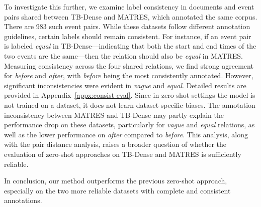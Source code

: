 To investigate this further, we examine label consistency in documents and event pairs shared between TB-Dense and MATRES, which annotated the same corpus. There are 983 such event pairs. While these datasets follow different annotation guidelines, certain labels should remain consistent. For instance, if an event pair is labeled \textit{equal} in TB-Dense—indicating that both the start and end times of the two events are the same—then the relation should also be \textit{equal} in MATRES. Measuring consistency across the four shared relations, we find strong agreement for \textit{before} and \textit{after}, with \textit{before} being the most consistently annotated. However, significant inconsistencies were evident in \textit{vague} and \textit{equal}. Detailed results are provided in Appendix~\ref{appx:consist-eval}.  
Since in zero-shot settings the model is not trained on a dataset, it does not learn dataset-specific biases. The annotation inconsistency between MATRES and TB-Dense may partly explain the performance drop on these datasets, particularly for \textit{vague} and \textit{equal} relations, as well as the lower performance on \textit{after} compared to \textit{before}.
This analysis, along with the pair distance analysis, raises a broader question of whether the evaluation of zero-shot approaches on TB-Dense and MATRES is sufficiently reliable. 

In conclusion, our method outperforms the previous zero-shot approach, especially on the two more reliable datasets with complete and consistent annotations.


